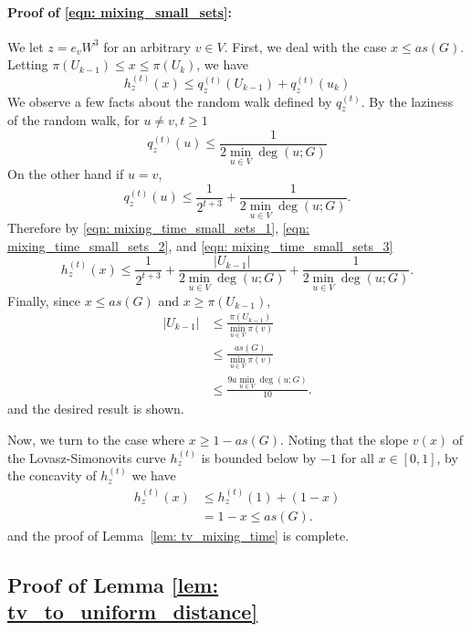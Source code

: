 \documentclass[11pt,twoside]{article}
\newcommand{\abs}[1]{\left \lvert #1 \right \rvert}
\newcommand{\1}{\mathbf{1}}
\begin{document}
\paragraph{Proof of \eqref{eqn: mixing_small_sets}:}
We let $z = e_vW^3$ for an arbitrary $v \in V$. First, we deal with the case $x \leq as(G)$. Letting $\pi(U_{k-1}) \leq x \leq \pi(U_{k})$, we have
\begin{equation}
\label{eqn: mixing_time_small_sets_1}
h_z^{(t)}(x) \leq q_z^{(t)}(U_{k - 1}) + q_z^{(t)}(u_k)
\end{equation}
We observe a few facts about the random walk defined by $q_z^{(t)}$. By the laziness of the random walk, for $u \neq v, t \geq 1$
\begin{equation}
\label{eqn: mixing_time_small_sets_2}
q_z^{(t)}(u) \leq \frac{1}{2 \min_{u \in V}\deg(u;G)}
\end{equation}
On the other hand if $u = v$,
\begin{equation}
\label{eqn: mixing_time_small_sets_3}
q_z^{(t)}(u) \leq \frac{1}{2^{t + 3}} + \frac{1}{2\min_{u \in V}\deg(u;G)}.
\end{equation}
Therefore by \eqref{eqn: mixing_time_small_sets_1}, \eqref{eqn: mixing_time_small_sets_2}, and \eqref{eqn: mixing_time_small_sets_3}
\begin{equation*}
h_z^{(t)}(x) \leq \frac{1}{2^{t + 3}} + \frac{\abs{U_{k - 1}}}{2 \min_{u \in V}\deg(u;G)} + \frac{1}{2 \min_{u \in V}\deg(u;G)}.
\end{equation*}
Finally, since $x \leq a s(G)$ and $x \geq \pi(U_{k - 1})$,
\begin{align*}
\abs{U_{k - 1}} & \leq \frac{\pi(U_{k-1})}{\min_{u \in V} \pi(v) } \\
& \leq \frac{as(G)}{\min_{u \in V} \pi(v) } \\
& \leq \frac{9a\min_{u \in V}\deg(u;G)}{10}.
\end{align*}
and the desired result is shown.

Now, we turn to the case where $x \geq 1 - as(G)$. Noting that the slope $v(x)$ of the Lovasz-Simonovits curve $h_z^{(t)}$ is bounded below by $-1$ for all $x \in [0,1]$, by the concavity of $h_z^{(t)}$ we have
\begin{align*}
h_z^{(t)}(x) & \leq h_z^{(t)}(1) + (1 - x) \\
& = 1 - x \leq as(G).
\end{align*}
and the proof of Lemma~\ref{lem: tv_mixing_time} is complete.

\subsection{Proof of Lemma \ref{lem: tv_to_uniform_distance}}
\end{document}
